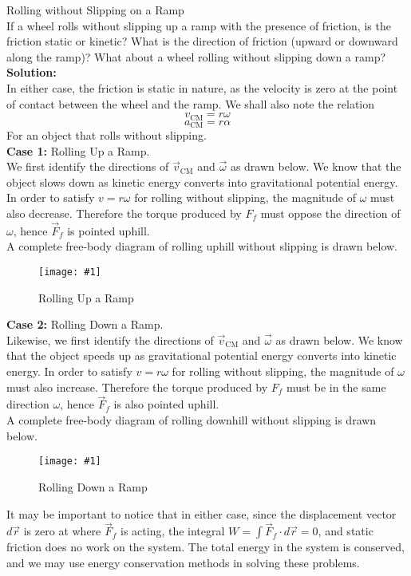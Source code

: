 \documentclass[11pt]{article}
\newcommand{\fig}[4]{
    \begin{figure}[H]
        \centering
        \texttt{[image: \#1]}
        \caption{#2}
        \label{exp4fit}
    \end{figure}
}
\theoremstyle{gangnamstyle}{\newtheorem{definition}{Definition}[]}
\theoremstyle{gangnamstyle}{\newtheorem{example}{Example}[]}
\theoremstyle{gangnamstyle}{\newtheorem{problem}{Problem}[]}
\theoremstyle{gangnamstyle}{\newtheorem{warning}{Warning}[]}
\begin{document}
\begin{example}
Rolling without Slipping on a Ramp \\
If a wheel rolls without slipping up a ramp with the presence of friction, is the friction static or kinetic? What is the direction of friction (upward or downward along the ramp)? What about a wheel rolling without slipping down a ramp? \\

\textbf{Solution:} \\
In either case, the friction is static in nature, as the velocity is zero at the point of contact between the wheel and the ramp. We shall also note the relation
\[ v_{\text{CM}} = r\omega \]
\[ a_{\text{CM}} = r\alpha \]
For an object that rolls without slipping. \\

\textbf{Case 1:} Rolling Up a Ramp. \\
We first identify the directions of $\Vec{v}_{\text{CM}}$ and $\Vec{\omega}$ as drawn below. We know that the object slows down as kinetic energy converts into gravitational potential energy. In order to satisfy $v = r\omega$ for rolling without slipping, the magnitude of $\omega$ must also decrease. Therefore the torque produced by $F_f$ must oppose the direction of $\omega$, hence $\Vec{F}_f$ is pointed uphill. \\
A complete free-body diagram of rolling uphill without slipping is drawn below. 
\fig{figs/n8/up.jpeg}{Rolling Up a Ramp}{0.11}{0}

\textbf{Case 2:} Rolling Down a Ramp. \\
Likewise, we first identify the directions of $\Vec{v}_{\text{CM}}$ and $\Vec{\omega}$ as drawn below. We know that the object speeds up as gravitational potential energy converts into kinetic energy. In order to satisfy $v = r\omega$ for rolling without slipping, the magnitude of $\omega$ must also increase. Therefore the torque produced by $F_f$ must be in the same direction $\omega$, hence $\Vec{F}_f$ is also pointed uphill. \\
A complete free-body diagram of rolling downhill without slipping is drawn below. 
\fig{figs/n8/down.jpeg}{Rolling Down a Ramp}{0.1}{0}

It may be important to notice that in either case, since the displacement vector $d\Vec{r}$ is zero at where $\Vec{F}_f$ is acting, the integral $W = \int \Vec{F}_f \cdot d\Vec{r} = 0$, and static friction does no work on the system. The total energy in the system is conserved, and we may use energy conservation methods in solving these problems. 
\end{example}
\end{document}
